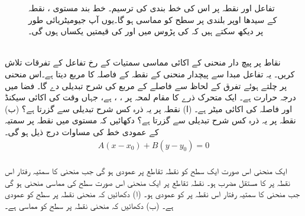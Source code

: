 \begin{figure}
\begin{minipage}{0.45\textwidth}
\caption{تفاعل  اور نقطہ  پر  اس کی خط بندی  کی ترسیم۔  خط بند مستوی ،  نقطہ  کے سیدھا اوپر بلندی پر   سطح  کو مماسی ہو گا۔یوں آپ جیومیٹریائی طور پر دیکھ سکتے ہیں کہ  کی پڑوس میں  اور  کی قیمتیں یکساں ہوں گی۔}
\label{شکل_سوال_کثیرالمتغیر_خط_بندی-تفاعل}
\end{minipage}
\end{figure}
\\
نقاط   پر پیچ دار  منحنی   کے اکائی مماسی سمتیات کے رخ     تفاعل  کے تفرقات   تلاش کریں۔ یہ تفاعل مبدا سے پیچدار منحنی کے نقطہ  کے  فاصلہ کا مربع  دیتا ہے۔اس منحنی پر چلتے ہوئے   تفرق    کے لحاظ سے فاصلے کے مربع کی شرح تبدیلی دے گا۔
فضا میں درجہ حرارت  ہے۔ ایک  متحرک ذرے کا مقام لمحہ  پر  ،   ،    ہے، جہاں وقت کی اکائی سیکنڈ اور فاصلہ کی اکائی میٹر ہے۔ (ا)  نقطہ  پر یہ ذرہ کس شرح تبدیلی  سے گزرتا ہے؟  (ب)  نقطہ  پر یہ ذرہ کس شرح تبدیلی  سے گزرتا ہے؟ 
دکھائیں کہ مستوی  میں  نقطہ    پر سمتیہ   کے عمودی خط کی مساوات درج ذیل ہو گی۔
\begin{align*}
A(x-x_0)+B(y-y_0)=0
\end{align*}
\\
ایک منحنی اس صورت ایک سطح  کو نقطہ تقاطع پر عمودی ہو گی جب منحنی کا سمتیہ رفتار اس نقطہ پر  کا مستقل مضرب ہو۔ نقطہ تقاطع پر ایک منحنی اس صورت  سطح  کی مماسی منحنی ہو گی جب  منحنی کا سمتیہ رفتار  اس نقطہ پر  کو عمودی ہو۔ (ا) دکھائیں کہ منحنی   نقطہ  پر سطح    کو عمودی ہے۔ (ب) دکھائیں کہ منحنی  نقطہ  پر سطح   کو مماسی ہے۔
